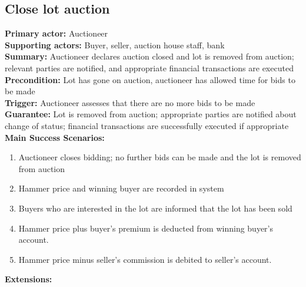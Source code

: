 \documentclass[titlepage, 12pt]{extarticle}
\begin{document}
\subsection{Close lot auction}
{\bf Primary actor: } Auctioneer 
\\{\bf Supporting actors: } Buyer, seller, auction house staff, bank
\\{\bf Summary: } Auctioneer declares auction closed and lot is removed from auction; relevant parties are notified, and appropriate financial transactions are executed
\\{\bf Precondition: } Lot has gone on auction, auctioneer has allowed time for bids to be made
\\{\bf Trigger: } Auctioneer assesses that there are no more bids to be made
\\{\bf Guarantee: } Lot is removed from auction; appropriate parties are notified about change of status; financial transactions are successfully executed if appropriate
\\{\bf Main Success Scenarios: }
\begin{enumerate}
\item Auctioneer closes bidding; no further bids can be made and the lot is removed from auction
\item Hammer price and winning buyer are recorded in system
\item Buyers who are interested in the lot are informed that the lot has been sold
\item Hammer price plus buyer's premium is deducted from winning buyer's account. 
\item Hammer price minus seller's commission is debited to seller's account. 
\end{enumerate}
{\bf Extensions: }
\end{document}

